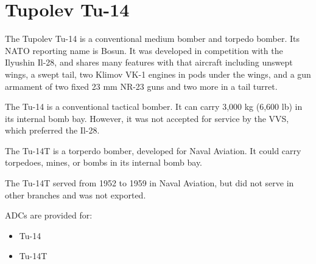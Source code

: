 \section*{Tupolev Tu-14}

The Tupolev Tu-14 is a conventional medium bomber and torpedo bomber. Its NATO reporting name is Bosun. It was developed in competition with the Ilyushin Il-28, and shares many features with that aircraft including unswept wings, a swept tail, two Klimov VK-1 engines in pods under the wings, and a gun armament of two fixed 23 mm NR-23 guns and two more in a tail turret.

The Tu-14 is a conventional tactical bomber. It can carry 3,000 kg (6,600 lb) in its internal bomb bay. However, it was not accepted for service by the VVS, which preferred the Il-28.

The Tu-14T is a torperdo bomber, developed for Naval Aviation. It could carry torpedoes, mines, or bombs in its internal bomb bay.

The Tu-14T served from 1952 to 1959 in Naval Aviation, but did not serve in other branches and was not exported.

ADCs are provided for:
\begin{itemize}
    \item Tu-14
    \item Tu-14T
\end{itemize}